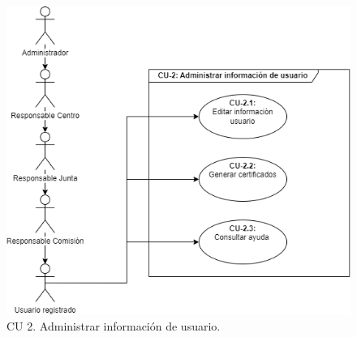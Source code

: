 \begin{figure}[H]
        \centering
        \includegraphics[scale=0.75]{img/diagramas/Funcional/CU-2.png}
        \caption{CU 2. Administrar información de usuario.}
        \label{fig:Diagrama-Caso de uso 2. Administrar información de usuario}
    \end{figure}

